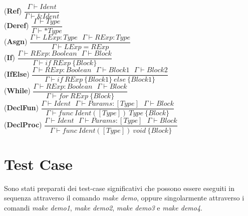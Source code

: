 \documentclass[12pt]{article}
\begin{document}
\begin{center}
\noindent(\textbf{Ref})
$\dfrac{\Gamma \vdash Ident}{\Gamma \vdash \text{\&} Ident}$\\[0.1in]
\noindent(\textbf{Deref})
$\dfrac{\Gamma \vdash Type}{\Gamma \vdash \text{*} Type}$\\[0.1in]

\noindent(\textbf{Asgn})
$\dfrac{\Gamma \vdash LExp:Type\ \ \ \Gamma \vdash RExp:Type}{\Gamma \vdash LExp = RExp}$\\[0.1in]

\noindent(\textbf{If})
$\dfrac{\Gamma \vdash RExp:Boolean\ \ \ \Gamma \vdash Block}{\Gamma \vdash if\ RExp\ \{ Block\}}$\\[0.1in]
\noindent(\textbf{IfElse})
$\dfrac{\Gamma \vdash RExp:Boolean\ \ \ \Gamma \vdash Block1\ \ \ \Gamma \vdash Block2}{\Gamma \vdash if\ RExp\ \{ Block1\}\ else\ \{ Block1\}}$\\[0.1in]
\noindent(\textbf{While})
$\dfrac{\Gamma \vdash RExp:Boolean\ \ \ \Gamma \vdash Block}{\Gamma \vdash for\ RExp\ \{ Block\}}$\\[0.1in]

\noindent(\textbf{DeclFun})
$\dfrac{\Gamma \vdash Ident\ \ \ \Gamma \vdash Params:[Type]\ \ \ \Gamma \vdash Block}{\Gamma \vdash func\ Ident ([Type])\ Type\ \{Block\}}$\\[0.1in]
\noindent(\textbf{DeclProc})
$\dfrac{\Gamma \vdash Ident\ \ \ \Gamma \vdash Params:[Type]\ \ \ \Gamma \vdash Block}{\Gamma \vdash func\ Ident ([Type])\ void\ \{Block\}}$\\[0.1in]
\end{center}





\pagebreak
\section{Test Case}
Sono stati preparati dei test-case significativi che possono essere eseguiti in sequenza attraverso il comando \textit{make demo}, oppure singolarmente attraverso i comandi \textit{make demo1}, \textit{make demo2}, \textit{make demo3} e \textit{make demo4}.
\end{document}
